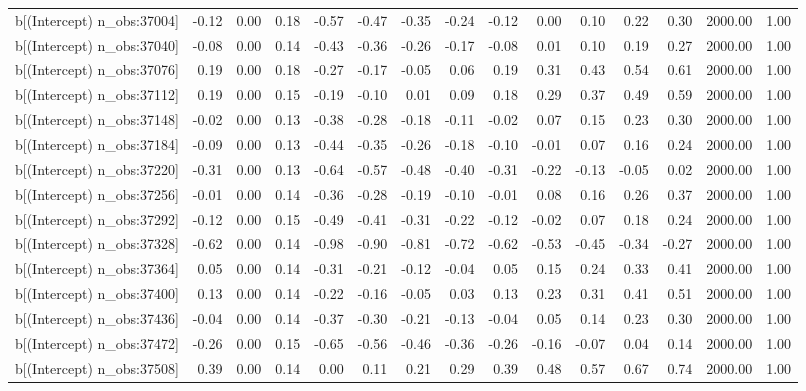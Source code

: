 \begin{table}[ht]
\begin{tabular}{rrrrrrrrrrrrrrr}
  b[(Intercept) n\_obs:37004] & -0.12 & 0.00 & 0.18 & -0.57 & -0.47 & -0.35 & -0.24 & -0.12 & 0.00 & 0.10 & 0.22 & 0.30 & 2000.00 & 1.00 \\ 
  b[(Intercept) n\_obs:37040] & -0.08 & 0.00 & 0.14 & -0.43 & -0.36 & -0.26 & -0.17 & -0.08 & 0.01 & 0.10 & 0.19 & 0.27 & 2000.00 & 1.00 \\ 
  b[(Intercept) n\_obs:37076] & 0.19 & 0.00 & 0.18 & -0.27 & -0.17 & -0.05 & 0.06 & 0.19 & 0.31 & 0.43 & 0.54 & 0.61 & 2000.00 & 1.00 \\ 
  b[(Intercept) n\_obs:37112] & 0.19 & 0.00 & 0.15 & -0.19 & -0.10 & 0.01 & 0.09 & 0.18 & 0.29 & 0.37 & 0.49 & 0.59 & 2000.00 & 1.00 \\ 
  b[(Intercept) n\_obs:37148] & -0.02 & 0.00 & 0.13 & -0.38 & -0.28 & -0.18 & -0.11 & -0.02 & 0.07 & 0.15 & 0.23 & 0.30 & 2000.00 & 1.00 \\ 
  b[(Intercept) n\_obs:37184] & -0.09 & 0.00 & 0.13 & -0.44 & -0.35 & -0.26 & -0.18 & -0.10 & -0.01 & 0.07 & 0.16 & 0.24 & 2000.00 & 1.00 \\ 
  b[(Intercept) n\_obs:37220] & -0.31 & 0.00 & 0.13 & -0.64 & -0.57 & -0.48 & -0.40 & -0.31 & -0.22 & -0.13 & -0.05 & 0.02 & 2000.00 & 1.00 \\ 
  b[(Intercept) n\_obs:37256] & -0.01 & 0.00 & 0.14 & -0.36 & -0.28 & -0.19 & -0.10 & -0.01 & 0.08 & 0.16 & 0.26 & 0.37 & 2000.00 & 1.00 \\ 
  b[(Intercept) n\_obs:37292] & -0.12 & 0.00 & 0.15 & -0.49 & -0.41 & -0.31 & -0.22 & -0.12 & -0.02 & 0.07 & 0.18 & 0.24 & 2000.00 & 1.00 \\ 
  b[(Intercept) n\_obs:37328] & -0.62 & 0.00 & 0.14 & -0.98 & -0.90 & -0.81 & -0.72 & -0.62 & -0.53 & -0.45 & -0.34 & -0.27 & 2000.00 & 1.00 \\ 
  b[(Intercept) n\_obs:37364] & 0.05 & 0.00 & 0.14 & -0.31 & -0.21 & -0.12 & -0.04 & 0.05 & 0.15 & 0.24 & 0.33 & 0.41 & 2000.00 & 1.00 \\ 
  b[(Intercept) n\_obs:37400] & 0.13 & 0.00 & 0.14 & -0.22 & -0.16 & -0.05 & 0.03 & 0.13 & 0.23 & 0.31 & 0.41 & 0.51 & 2000.00 & 1.00 \\ 
  b[(Intercept) n\_obs:37436] & -0.04 & 0.00 & 0.14 & -0.37 & -0.30 & -0.21 & -0.13 & -0.04 & 0.05 & 0.14 & 0.23 & 0.30 & 2000.00 & 1.00 \\ 
  b[(Intercept) n\_obs:37472] & -0.26 & 0.00 & 0.15 & -0.65 & -0.56 & -0.46 & -0.36 & -0.26 & -0.16 & -0.07 & 0.04 & 0.14 & 2000.00 & 1.00 \\ 
  b[(Intercept) n\_obs:37508] & 0.39 & 0.00 & 0.14 & 0.00 & 0.11 & 0.21 & 0.29 & 0.39 & 0.48 & 0.57 & 0.67 & 0.74 & 2000.00 & 1.00 \\ 

\end{tabular}
\end{table}
